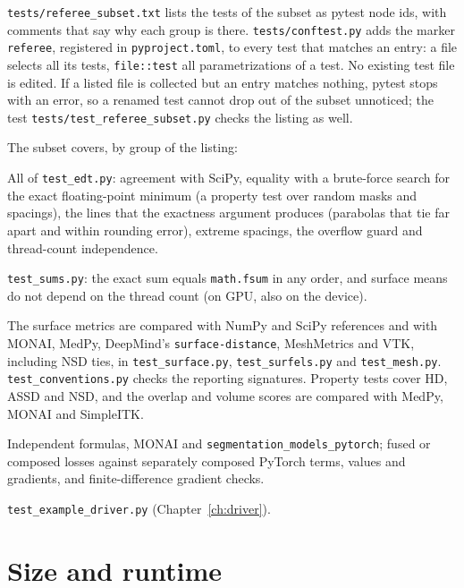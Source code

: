\texttt{tests/referee\_subset.txt} lists the tests of the subset as pytest node ids, with
comments that say why each group is there. \texttt{tests/conftest.py} adds the marker
\texttt{referee}, registered in \texttt{pyproject.toml}, to every test that matches an entry:
a file selects all its tests, \texttt{file::test} all parametrizations of a test. No existing
test file is edited. If a listed file is collected but an entry matches nothing, pytest stops
with an error, so a renamed test cannot drop out of the subset unnoticed; the test
\texttt{tests/test\_referee\_subset.py} checks the listing as well.

The subset covers, by group of the listing:
\begin{description}[nosep,leftmargin=0pt,labelindent=0pt]
\sloppy
\item[Exact distance transform.] All of \texttt{test\_edt.py}: agreement with SciPy, equality
  with a brute-force search for the exact floating-point minimum (a property test over random
  masks and spacings), the lines that the exactness argument produces (parabolas that tie far
  apart and within rounding error), extreme spacings, the overflow guard and
  thread-count independence.
\item[Correctly rounded sums.] \texttt{test\_sums.py}: the exact sum equals \texttt{math.fsum}
  in any order, and surface means do not depend on the thread count (on GPU, also on the device).
\item[Metric presets against reference tools.] The surface metrics are compared with NumPy and
  SciPy references and with MONAI, MedPy, DeepMind's \texttt{surface-distance}, MeshMetrics and
  VTK, including NSD ties, in \texttt{test\_surface.py}, \texttt{test\_surfels.py} and
  \texttt{test\_mesh.py}. \texttt{test\_conventions.py} checks the reporting signatures.
  Property tests cover HD, ASSD and NSD, and the overlap and volume scores are compared with MedPy,
  MONAI and SimpleITK.
\item[Losses against compositions.] Independent formulas, MONAI and
  \texttt{segmentation\_models\_pytorch}; fused or composed losses against separately composed
  PyTorch terms, values and gradients, and finite-difference gradient checks.
\item[The example driver.] \texttt{test\_example\_driver.py} (Chapter~\ref{ch:driver}).
\end{description}

\section{Size and runtime}\label{tests:runtime}

